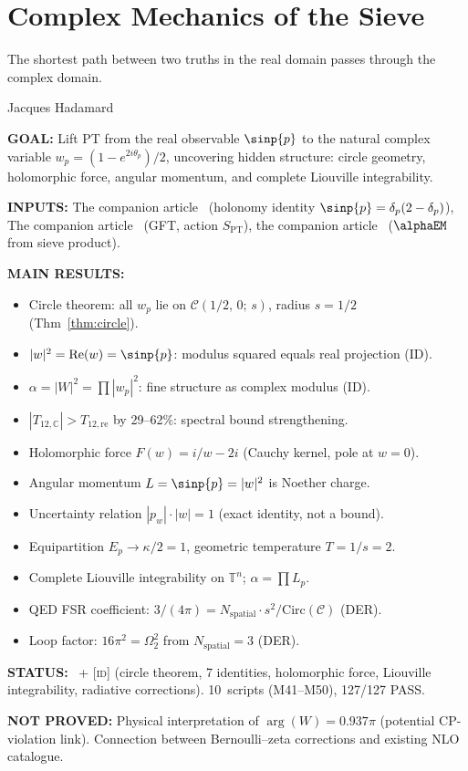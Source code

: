 \documentclass[12pt,a4paper]{article}
\begin{document}
\newpage
\section{Complex Mechanics of the Sieve}
\label{sec:complex}

\epigraph{The shortest path between two truths in the real domain passes
through the complex domain.}{Jacques Hadamard}

\begin{statusbox}
\textbf{GOAL:}
  Lift PT from the real observable $\sinp{p}$ to the natural complex
  variable $w_p = (1 - e^{2i\theta_p})/2$, uncovering hidden structure:
  circle geometry, holomorphic force, angular momentum, and complete
  Liouville integrability.

\textbf{INPUTS:}
  The companion article~\cite{companion_M2} (holonomy identity $\sinp{p} = \delta_p(2-\delta_p)$),
  The companion article~\cite{companion_M1} (GFT, action $S_{\mathrm{PT}}$),
  the companion article~\cite{companion_physics} ($\alphaEM$ from sieve product).

\textbf{MAIN RESULTS:}
  \begin{itemize}[nosep]
  \item Circle theorem: all $w_p$ lie on $\mathcal{C}(1/2,\,0;\, s)$, radius $s = 1/2$ (Thm~\ref{thm:circle}).
  \item $|w|^2 = \mathrm{Re}(w) = \sinp{p}$: modulus squared equals real projection (ID).
  \item $\alpha = |W|^2 = \prod |w_p|^2$: fine structure as complex modulus (ID).
  \item $|T_{12,\mathbb{C}}| > T_{12,\mathrm{re}}$ by 29--62\%: spectral bound strengthening.
  \item Holomorphic force $F(w) = i/w - 2i$ (Cauchy kernel, pole at $w = 0$).
  \item Angular momentum $L = \sinp{p} = |w|^2$ is Noether charge.
  \item Uncertainty relation $|p_w|\cdot|w| = 1$ (exact identity, not a bound).
  \item Equipartition $E_p \to \kappa/2 = 1$, geometric temperature $T = 1/s = 2$.
  \item Complete Liouville integrability on $\mathbb{T}^n$; $\alpha = \prod L_p$.
  \item QED FSR coefficient: $3/(4\pi) = N_{\mathrm{spatial}}\cdot s^2/\mathrm{Circ}(\mathcal{C})$ (DER).
  \item Loop factor: $16\pi^2 = \Omega_2^2$ from $N_{\mathrm{spatial}} = 3$ (DER).
  \end{itemize}

\textbf{STATUS:}
  \DERTAG\ + \textsc{[id]} (circle theorem, 7 identities,
  holomorphic force, Liouville integrability, radiative corrections).
  10~scripts (M41--M50), 127/127 PASS.

\textbf{NOT PROVED:}
  Physical interpretation of $\arg(W) = 0.937\pi$ (potential CP-violation link).
  Connection between Bernoulli--zeta corrections and existing NLO catalogue.
\end{statusbox}
\end{document}
